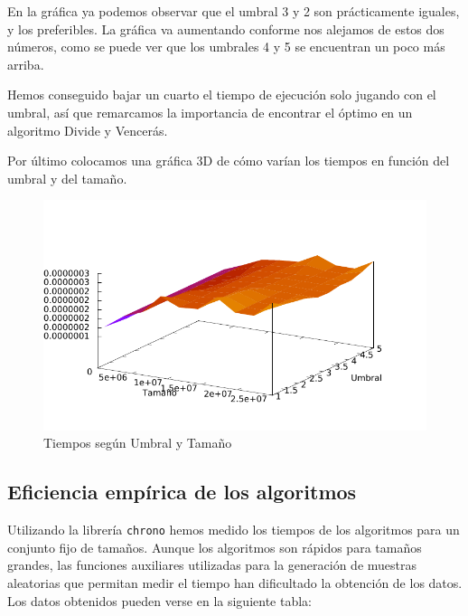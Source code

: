 En la gráfica ya podemos observar que el umbral 3 y 2 son prácticamente iguales, y los preferibles. La gráfica va aumentando conforme nos alejamos de estos dos números, como se puede ver que los umbrales 4 y 5 se encuentran un poco más arriba.

Hemos conseguido bajar un cuarto el tiempo de ejecución solo jugando con el umbral, así que remarcamos la importancia de encontrar el óptimo en un algoritmo Divide y Vencerás.

Por último colocamos una gráfica 3D de cómo varían los tiempos en función del umbral y del tamaño.

\begin{figure}[H]\includegraphics[width=13cm]{img/umbral_posicion.pdf} \centering
	\caption{Tiempos según Umbral y Tamaño}\end{figure}

\subsection{Eficiencia empírica de los algoritmos}

Utilizando la librería \texttt{chrono} hemos medido los tiempos de los algoritmos para un conjunto fijo de tamaños. Aunque los algoritmos son rápidos para tamaños grandes, las funciones auxiliares utilizadas para la generación de muestras aleatorias que permitan medir el tiempo han dificultado la obtención de los datos. Los datos obtenidos pueden verse en la siguiente tabla:



\vspace*{1cm}

\posObvio
{}\posDyV
{} {\posObvio}

